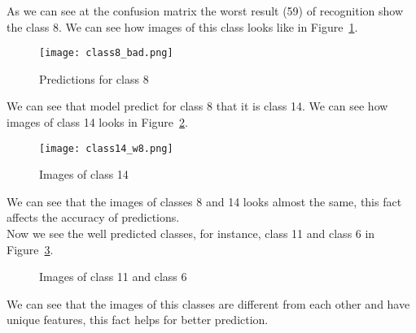 \documentclass[a4paper, twoside, english]{article}
\begin{document}
As we can see at the confusion matrix the worst result (59) of recognition show the class 8. We can see how images of this class looks like in Figure~\ref{fig:cl8}.\\
\begin{figure}[h!]
	\centerline{\texttt{[image: class8\_bad.png]}}
	\caption[cl8]{Predictions for class 8}
	\label{fig:cl8}
\end{figure}
\newpage

We can see that model predict for class 8 that it is class 14. We can see how images of class 14 looks in  Figure~\ref{fig:cl14}.\\

\begin{figure}[hb]
	\centerline{\texttt{[image: class14\_w8.png]}}
	\caption[cl14]{Images of class 14}
	\label{fig:cl14}
\end{figure}

We can see that the images of classes 8 and 14 looks almost the same, this fact affects the accuracy of predictions.\\
Now we see the well predicted classes, for instance, class 11 and class 6 in  Figure~\ref{fig:classes_116}.\\

\begin{figure}[h!]
	\centerline
	{
		\qquad
	}
	\caption[Classes]{Images of class 11 and class 6}
	\label{fig:classes_116}
\end{figure}
We can see that the images of this classes are different from each other and have unique features, this fact helps for better prediction.


%
%
\end{document}

